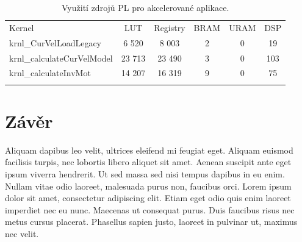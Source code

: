 \documentclass[a4paper, twoside, 11pt]{article}
\begin{document}
	\begin{table}[H]
		\centering
		\caption{Využití zdrojů PL pro akcelerované aplikace.}
		\vspace*{0.15cm}
		
		\begin{tabular}{!{\vrule width 2pt} l | c | c | c | c | c !{\vrule width 2pt}}
		Kernel & LUT & Registry & BRAM & URAM & DSP\\
		krnl\_CurVelLoadLegacy & 6 520 & 8 003 & 2 & 0 & 19\\ \hline
		krnl\_calculateCurVelModel & 23 713 & 23 490 & 3 & 0 & 103\\ \hline
		krnl\_calculateInvMot & 14 207 & 16 319 & 9 & 0 & 75\\
			\end{tabular}
			\label{tab:vyuziti-zdroju-pl-pro-akcelerovane-aplikace}
	\end{table}



		
\newpage
{} 
\section*{Závěr}
Aliquam dapibus leo velit, ultrices eleifend mi feugiat eget. Aliquam euismod facilisis turpis, nec lobortis libero aliquet sit amet. Aenean suscipit ante eget ipsum viverra hendrerit. Ut sed massa sed nisi tempus dapibus in eu enim. Nullam vitae odio laoreet, malesuada purus non, faucibus orci. Lorem ipsum dolor sit amet, consectetur adipiscing elit. Etiam eget odio quis enim laoreet imperdiet nec eu nunc. Maecenas ut consequat purus. Duis faucibus risus nec metus cursus placerat. Phasellus sapien justo, laoreet in pulvinar ut, maximus nec velit.\par
	

\flushbottom %

\end{document}
